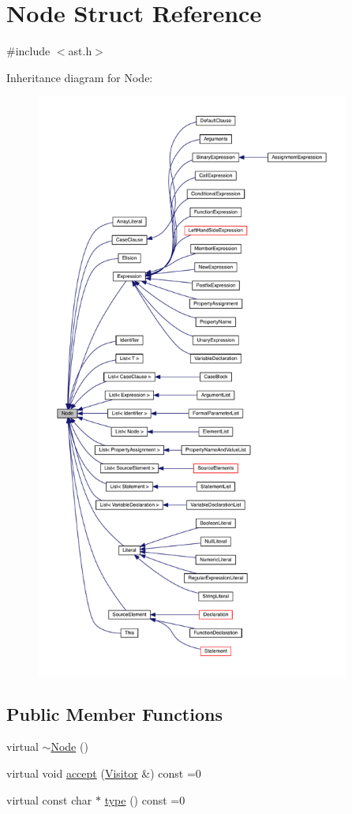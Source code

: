 \hypertarget{struct_node}{}\section{Node Struct Reference}
\label{struct_node}


{\ttfamily \#include $<$ast.\+h$>$}



Inheritance diagram for Node\+:
\nopagebreak
\begin{figure}[H]
\begin{center}
\leavevmode
\includegraphics[height=550pt]{struct_node__inherit__graph}
\end{center}
\end{figure}
\subsection*{Public Member Functions}
\begin{DoxyCompactItemize}
\item 
virtual \hyperlink{struct_node_af5e3fa79300bf5f3f2f3ecae6e795a94}{$\sim$\+Node} ()
\item 
virtual void \hyperlink{struct_node_a10bd7af968140bbf5fa461298a969c71}{accept} (\hyperlink{struct_visitor}{Visitor} \&) const =0
\item 
virtual const char $\ast$ \hyperlink{struct_node_a82f29420d0a38efcc370352528e94e9b}{type} () const =0
\end{DoxyCompactItemize}



